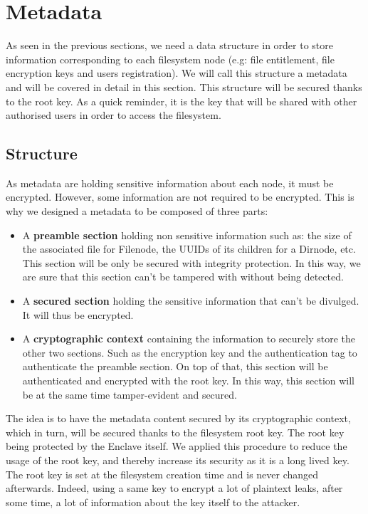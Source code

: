 \documentclass[../main.tex]{subfiles}
\begin{document}
\section{Metadata}
\label{section:lauxus:metadata}

\par As seen in the previous sections, we need a data structure in order to store information corresponding to each filesystem node (e.g: file entitlement, file encryption keys and users registration). We will call this structure a metadata and will be covered in detail in this section. This structure will be secured thanks to the root key. As a quick reminder, it is the key that will be shared with other authorised users in order to access the filesystem.


\subsection{Structure}
\label{section:lauxus:metadata_structure}

\par As metadata are holding sensitive information about each node, it must be encrypted. However, some information are not required to be encrypted. This is why we designed a metadata to be composed of three parts:
\begin{itemize}
    \item A \textbf{preamble section} holding non sensitive information such as: the size of the associated file for Filenode, the UUIDs of its children for a Dirnode, etc. This section will be only be secured with integrity protection. In this way, we are sure that this section can't be tampered with without being detected.
    \item A \textbf{secured section} holding the sensitive information that can't be divulged. It will thus be encrypted.
    \item A \textbf{cryptographic context} containing the information to securely store the other two sections. Such as the encryption key and the authentication tag to authenticate the preamble section. On top of that, this section will be authenticated and encrypted with the root key. In this way, this section will be at the same time tamper-evident and secured.
\end{itemize}
\par The idea is to have the metadata content secured by its cryptographic context, which in turn, will be secured thanks to the filesystem root key. The root key being protected by the Enclave itself. We applied this procedure to reduce the usage of the root key, and thereby increase its security as it is a long lived key. The root key is set at the filesystem creation time and is never changed afterwards. Indeed, using a same key to encrypt a lot of plaintext leaks, after some time, a lot of information about the key itself to the attacker.
\end{document}
